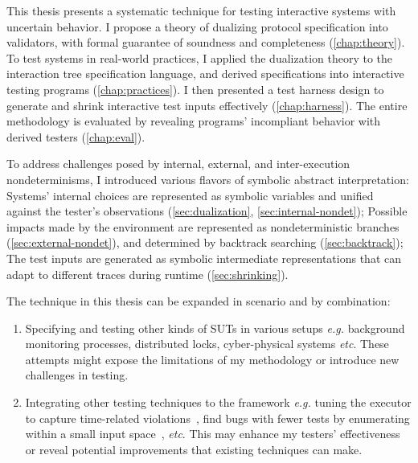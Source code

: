 This thesis presents a systematic technique for testing interactive systems with
uncertain behavior.  I propose a theory of dualizing protocol specification into
validators, with formal guarantee of soundness and completeness
(\autoref{chap:theory}).  To test systems in real-world practices, I applied the
dualization theory to the interaction tree specification language, and derived
specifications into interactive testing programs (\autoref{chap:practices}).  I
then presented a test harness design to generate and shrink interactive test
inputs effectively (\autoref{chap:harness}).  The entire methodology is
evaluated by revealing programs' incompliant behavior with derived testers
(\autoref{chap:eval}).

To address challenges posed by internal, external, and inter-execution
nondeterminisms, I introduced various flavors of symbolic abstract
interpretation: Systems' internal choices are represented as symbolic variables
and unified against the tester's observations (\autoref{sec:dualization},
\autoref{sec:internal-nondet}); Possible impacts made by the environment are
represented as nondeterministic branches (\autoref{sec:external-nondet}), and
determined by backtrack searching (\autoref{sec:backtrack}); The test inputs are
generated as symbolic intermediate representations that can adapt to different
traces during runtime (\autoref{sec:shrinking}).

The technique in this thesis can be expanded in scenario and by combination:
\begin{enumerate}
\item Specifying and testing other kinds of SUTs in various setups {\it e.g.}
  background monitoring processes, distributed locks, cyber-physical systems
  {\it etc}.  These attempts might expose the limitations of my methodology or
  introduce new challenges in testing.

\item Integrating other testing techniques to the framework {\it e.g.} tuning
  the executor to capture time-related violations~\cite{pkt-dyn}, find bugs with
  fewer tests by enumerating within a small input space~\cite{judge-cover}, {\it
    etc}.  This may enhance my testers' effectiveness or reveal potential
  improvements that existing techniques can make.
\end{enumerate}
